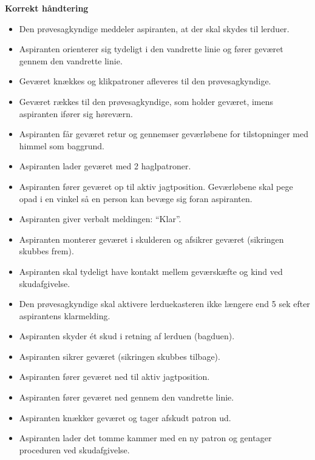 \textbf{Korrekt håndtering}
\begin{itemize}\setlength{\itemsep}{2pt}
  \item Den prøvesagkyndige meddeler aspiranten, at der skal skydes til lerduer.
  \item Aspiranten orienterer sig tydeligt i den vandrette linie og fører geværet gennem den vandrette linie.
  \item Geværet knækkes og klikpatroner afleveres til den prøvesagkyndige.
  \item Geværet rækkes til den prøvesagkyndige, som holder geværet, imens aspiranten ifører sig høreværn.
  \item Aspiranten får geværet retur og gennemser geværløbene for tilstopninger med himmel som baggrund.
  \item Aspiranten lader geværet med 2 haglpatroner.
  \item Aspiranten fører geværet op til aktiv jagtposition. Geværløbene skal pege opad i en vinkel så en person kan bevæge sig foran aspiranten.
  \item Aspiranten giver verbalt meldingen: ``Klar''.
  \item Aspiranten monterer geværet i skulderen og afsikrer geværet (sikringen skubbes frem).
  \item Aspiranten skal tydeligt have kontakt mellem geværskæfte og kind ved skudafgivelse.
  \item Den prøvesagkyndige skal aktivere lerduekasteren ikke længere end 5 sek efter aspirantens klarmelding.
  \item Aspiranten skyder ét skud i retning af lerduen (bagduen).
  \item Aspiranten sikrer geværet (sikringen skubbes tilbage).
  \item Aspiranten fører geværet ned til aktiv jagtposition.
  \item Aspiranten fører geværet ned gennem den vandrette linie.
  \item Aspiranten knækker geværet og tager afskudt patron ud.
  \item Aspiranten lader det tomme kammer med en ny patron og gentager proceduren ved skudafgivelse.
\end{itemize}

